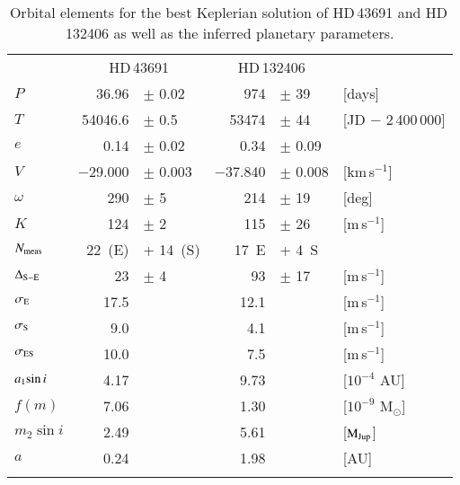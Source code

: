 \documentclass{aa}
\begin{document}
\begin{table}[t]
\centering
  \caption[]{Orbital elements for the best Keplerian solution of HD\,43691
             and HD\,132406 as well as the inferred planetary parameters.}
  \label{orb_elem}
\begin{tabular}{l r@{ }l r@{ }l l}
\hline
\hline
\noalign{\smallskip}
 & \multicolumn{2}{c}{HD\,43691} & \multicolumn{2}{c}{HD\,132406} & \\
\noalign{\smallskip}
\hline
\noalign{\smallskip}
$P$                  & 36.96     & $\pm$ 0.02  & 974       & $\pm$ 39    & [days]                \\
$T$                  & 54046.6   & $\pm$ 0.5   & 53474     & $\pm$ 44    & {\scriptsize [JD $-$ 2\,400\,000]}  \\
$e$                  & 0.14      & $\pm$ 0.02  & 0.34      & $\pm$ 0.09  &                       \\
$V$                  & $-$29.000 & $\pm$ 0.003 & $-$37.840 & $\pm$ 0.008 & [km\,s$^{-1}$]        \\
$\omega$             & 290       & $\pm$ 5     & 214       & $\pm$ 19    & [deg]                 \\
$K$                  & 124       & $\pm$ 2     & 115       & $\pm$ 26    & [m\,s$^{-1}$]         \\
$N_{\rm meas}$       & 22~(E)    & + 14~(S)    & 17~E      & + 4~S       &                       \\
$\Delta_{\rm S-E}$   & 23        & $\pm$ 4     & 93        & $\pm$ 17    & [m\,s$^{-1}$]         \\
$\sigma_{\rm E}$     & 17.5      &             & 12.1      &             & [m\,s$^{-1}$]         \\
$\sigma_{\rm S}$     & 9.0       &             & 4.1       &             & [m\,s$^{-1}$]         \\
$\sigma_{\rm ES}$    & 10.0      &             & 7.5       &             & [m\,s$^{-1}$]         \\
\noalign{\smallskip}
\hline
\noalign{\smallskip}
$a_{\rm 1} {\sin i}$ & 4.17      &             & 9.73      &             & [$10^{-4}$ AU]        \\
$f(m)$               & 7.06      &             & 1.30      &             & [$10^{-9}$ M$_\odot$] \\
$m_2 {\sin i}$       & 2.49      &             & 5.61      &             & [${\rm M_{Jup}}$]     \\
$a$                  & 0.24      &             & 1.98      &             & [AU]                  \\
\noalign{\smallskip}
\hline
\end{tabular}
\end{table}
\end{document}
